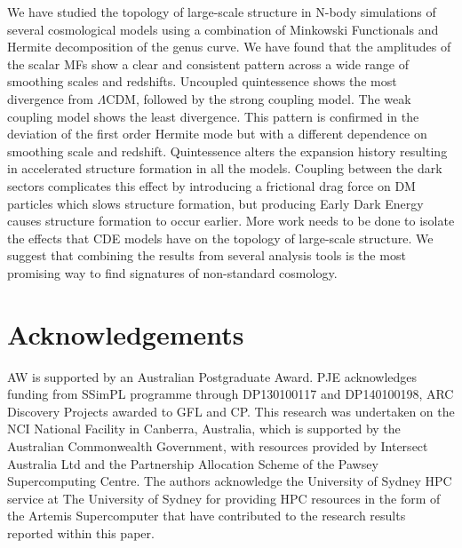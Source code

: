 \documentclass[a4paper,fleqn,usenatbib]{mnras}
\begin{document}
We have studied the topology of large-scale structure in N-body simulations of several cosmological models using a combination of Minkowski Functionals and Hermite decomposition of the genus curve. We have found that the amplitudes of the scalar MFs show a clear and consistent pattern across a wide range of smoothing scales and redshifts. Uncoupled quintessence shows the most divergence from $\Lambda$CDM, followed by the strong coupling model. The weak coupling model shows the least divergence. This pattern is confirmed in the deviation of the first order Hermite mode but with a different dependence on smoothing scale and redshift. Quintessence alters the expansion history resulting in accelerated structure formation in all the models. Coupling between the dark sectors complicates this effect by introducing a frictional drag force on DM particles which slows structure formation, but producing Early Dark Energy causes structure formation to occur earlier. More work needs to be done to isolate the effects that CDE models have on the topology of large-scale structure. We suggest that combining the results from several analysis tools is the most promising way to find signatures of non-standard cosmology.

\section*{Acknowledgements}

AW is supported by an Australian Postgraduate Award. PJE acknowledges funding from SSimPL programme through DP130100117 and DP140100198, ARC Discovery Projects awarded to GFL and CP. This research was undertaken on the NCI National Facility in Canberra, Australia, which is supported by the Australian Commonwealth Government, with resources provided by Intersect Australia Ltd and the Partnership Allocation Scheme of the Pawsey Supercomputing Centre. The authors acknowledge the University of Sydney HPC service at The University of Sydney for providing HPC resources in the form of the Artemis Supercomputer that have contributed to the research results reported within this paper. 




%
\end{document}
